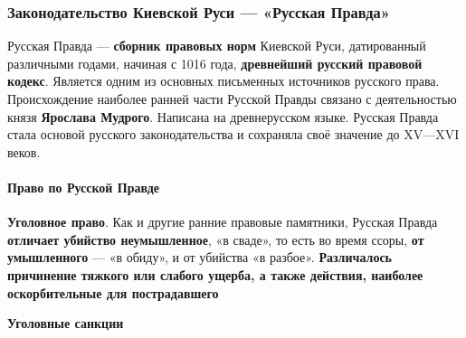 \documentclass{article}
\begin{document}
\subsubsection{Законодательство Киевской Руси — «Русская Правда»}

Русская Правда — \textbf{сборник правовых норм} Киевской Руси, датированный различными годами, начиная с 1016 года, \textbf{древнейший русский правовой кодекс}. Является одним из основных письменных источников русского права. Происхождение наиболее ранней части Русской Правды связано с деятельностью князя \textbf{Ярослава Мудрого}. Написана на древнерусском языке. Русская Правда стала основой русского законодательства и сохраняла своё значение до XV—XVI веков.

\paragraph{Право по Русской Правде}

\textbf{Уголовное право}. Как и другие ранние правовые памятники, Русская Правда \textbf{отличает убийство неумышленное}, «в сваде», то есть во время ссоры, \textbf{от умышленного} — «в обиду», и от убийства «в разбое». \textbf{Различалось причинение тяжкого или слабого ущерба, а также действия, наиболее оскорбительные для пострадавшего}

\textbf{Уголовные санкции}
\end{document}
